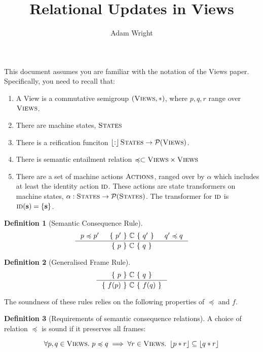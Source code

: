 \documentclass{article}
\theoremstyle{definition}
\newtheorem{definition}{Definition}
\theoremstyle{theorem}
\newcommand{\totalfunc}{\rightarrow}
\newcommand{\powerset}{\curly{P}}
\newcommand{\semRel}{\preccurlyeq}
\newcommand{\Code}{\mathbb{C}}
\newcommand{\Views}{\textsc{Views}}
\newcommand{\Actions}{\textsc{Actions}}
\newcommand{\States}{\textsc{States}}
\newcommand{\idAction}{\textsc{id}}
\newcommand{\action}{\alpha}
\newcommand{\state}{\mathbf{s}}
\newcommand{\curly}[1]{{ \cal #1 }}
\newcommand{\reify}[1]{\left\lfloor{#1}\right\rfloor}
\newcommand{\triple}[3]{\{\ #1\ \}\ #2\ \{\ #3\ \}}
\begin{document}
\title{Relational Updates in Views}
\author{Adam Wright}

\maketitle

This document assumes you are familiar with the notation of the Views paper. Specifically, you need to recall that:

\begin{enumerate}
  \item A View is a commutative semigroup $(\Views, *)$, where $p, q, r$ range over $\Views$.
  \item There are machine states, $\States$
  \item There is a reification funciton $\reify : \States \totalfunc \powerset(\Views)$.
  \item There is semantic entailment relation $\semRel \subset \Views \times \Views$
  \item There are a set of machine actions $\Actions$, ranged over by $\action$ which includes at least the identity action $\idAction$. These actions are state transformers on machine states, $\action : \States \totalfunc \powerset(\States)$. The transformer for $\idAction$ is $\idAction(\state) = \{ \state \}$.
  \end{enumerate}

\begin{definition}[Semantic Consequence Rule]
  \begin{displaymath}
    \inference{p \semRel p' & \triple{p'}{\Code}{q'} & q' \semRel q}
              {\triple{p}{\Code}{q}}
  \end{displaymath}
\end{definition}

\begin{definition}[Generalised Frame Rule]
  \begin{displaymath}
    \inference{\triple{p}{\Code}{q}}
              {\triple{f(p)}{\Code}{f(q)}}
  \end{displaymath}
\end{definition}

The soundness of these rules relies on the following properties of $\semRel$ and $f$.

\begin{definition}[Requirements of semantic consequence relations]
  \label{definition:semanticConsequenceReqs}
  A choice of relation $\semRel$ is sound if it preserves all frames:

  \begin{displaymath}
    \forall p, q \in \Views.~p \semRel q \implies \forall r \in \Views.~ \reify{p * r} \subseteq \reify{q * r}
  \end{displaymath}
\end{definition}
\end{document}
